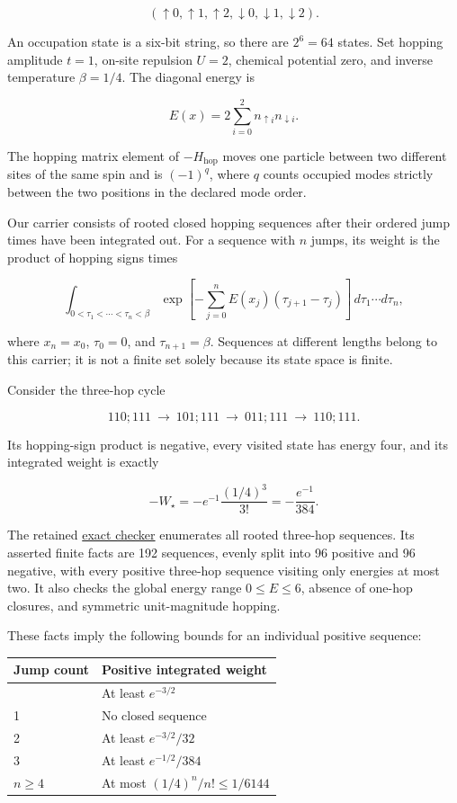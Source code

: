 \documentclass[
  11pt,
]{article}
\begin{document}
\[
(\uparrow0,\uparrow1,\uparrow2,\downarrow0,\downarrow1,\downarrow2).
\]

An occupation state is a six-bit string, so there are \(2^6=64\) states.
Set hopping amplitude \(t=1\), on-site repulsion \(U=2\), chemical
potential zero, and inverse temperature \(\beta=1/4\). The diagonal
energy is

\[
E(x)=2\sum_{i=0}^{2}n_{\uparrow i}n_{\downarrow i}.
\]

The hopping matrix element of \(-H_{\mathrm{hop}}\) moves one particle
between two different sites of the same spin and is \((-1)^q\), where
\(q\) counts occupied modes strictly between the two positions in the
declared mode order.

Our carrier consists of rooted closed hopping sequences after their
ordered jump times have been integrated out. For a sequence with \(n\)
jumps, its weight is the product of hopping signs times

\[
\int_{0<\tau_1<\cdots<\tau_n<\beta}
\exp\!\left[-\sum_{j=0}^{n} E(x_j)(\tau_{j+1}-\tau_j)\right]
\,d\tau_1\cdots d\tau_n,
\]

where \(x_n=x_0\), \(\tau_0=0\), and \(\tau_{n+1}=\beta\). Sequences at
different lengths belong to this carrier; it is not a finite set solely
because its state space is finite.

Consider the three-hop cycle

\[
110;111\ \longrightarrow\ 101;111\
\longrightarrow\ 011;111\ \longrightarrow\ 110;111.
\]

Its hopping-sign product is negative, every visited state has energy
four, and its integrated weight is exactly

\[
-W_\star=-e^{-1}\frac{(1/4)^3}{3!}
=-\frac{e^{-1}}{384}.
\]

The retained
\href{https://github.com/dbccpage/the_symbol_game/blob/c819bec432446dd3c9b1edf1583384cfe76c6c71/atlas/coda_atlas/symbol_game/002_pfp_signed_presentations_and_search_frontier/code/exact_fock_gap.py}{exact
checker} enumerates all rooted three-hop sequences. Its asserted finite
facts are 192 sequences, evenly split into 96 positive and 96 negative,
with every positive three-hop sequence visiting only energies at most
two. It also checks the global energy range \(0\leq E\leq6\), absence of
one-hop closures, and symmetric unit-magnitude hopping.

These facts imply the following bounds for an individual positive
sequence:

\begin{longtable}[]{@{}ll@{}}
\toprule\noalign{}
Jump count & Positive integrated weight \\
\midrule\noalign{}
\endhead
\bottomrule\noalign{}
\endlastfoot
0 & At least \(e^{-3/2}\) \\
1 & No closed sequence \\
2 & At least \(e^{-3/2}/32\) \\
3 & At least \(e^{-1/2}/384\) \\
\(n\geq4\) & At most \((1/4)^n/n!\leq1/6144\) \\
\end{longtable}
\end{document}

